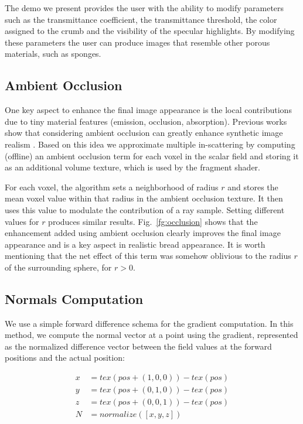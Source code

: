 The demo we present provides the user with the ability to modify parameters such as the transmittance coefficient, the transmittance threshold, the color assigned to the crumb and the visibility of the specular highlights. 
By modifying these parameters the user can produce images that resemble other porous materials, such as sponges.

\subsection*{Ambient Occlusion}

One key aspect to enhance the final image appearance is the local contributions due to tiny material features (emission, occlusion, absorption). 
Previous works show that considering ambient occlusion can greatly enhance synthetic image realism \cite{Hernell2010}.
Based on this idea we approximate multiple in-scattering by computing (offline) an ambient occlusion term for each voxel in the scalar field and storing it as an additional volume texture, which is used by the fragment shader.

For each voxel, the algorithm sets a neighborhood of radius $r$ and stores the mean voxel value within that radius in the ambient occlusion texture.
It then uses this value to modulate the contribution of a ray sample.
Setting different values for $r$ produces similar results. 
Fig.~\ref{fg:occlusion} shows that the enhancement added using ambient occlusion clearly improves the final image appearance and is a key aspect in realistic bread appearance. It is worth mentioning that the net effect of this term was somehow oblivious to the radius $r$ of the surrounding sphere, for $r > 0$.
 
\subsection*{Normals Computation}

We use a simple forward difference schema for the gradient computation. In this method, we compute the normal vector at a point using the gradient, represented as the normalized difference vector between the field values at the forward positions and the actual position:

\begin{equation}
\begin{aligned}
x &= tex(pos+(1,0,0)) - tex(pos)\\
y &= tex(pos+(0,1,0)) - tex(pos)\\
z &= tex(pos+(0,0,1)) - tex(pos) \\
N &= normalize([x,y,z])
\end{aligned}
\end{equation}

